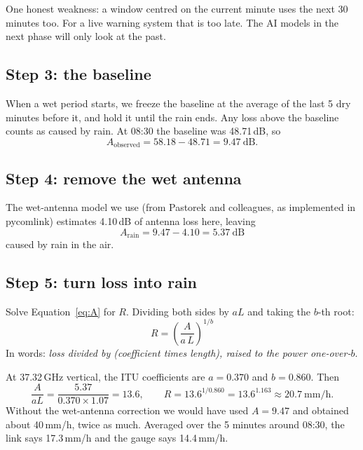 \documentclass[11pt,a4paper]{article}
\begin{document}
One honest weakness: a window centred on the current minute uses the next 30 minutes too. For a live warning
system that is too late. The AI models in the next phase will only look at the past.

\subsection*{Step 3: the baseline}
When a wet period starts, we freeze the baseline at the average of the last 5 dry minutes before it, and hold
it until the rain ends. Any loss above the baseline counts as caused by rain. At 08:30 the baseline was 48.71\,dB, so
\[
A_\text{observed} = 58.18 - 48.71 = 9.47\ \text{dB}.
\]

\subsection*{Step 4: remove the wet antenna}
The wet-antenna model we use (from Pastorek and colleagues, as implemented in pycomlink) estimates
4.10\,dB of antenna loss here, leaving
\[
A_\text{rain} = 9.47 - 4.10 = 5.37\ \text{dB}
\]
caused by rain in the air.

\subsection*{Step 5: turn loss into rain}
Solve Equation~\ref{eq:A} for $R$. Dividing both sides by $aL$ and taking the $b$-th root:
\begin{equation}
R = \left(\frac{A}{a\,L}\right)^{1/b}
\label{eq:inverse}
\end{equation}
In words: \emph{loss divided by (coefficient times length), raised to the power one-over-$b$}.

\begin{example}
At 37.32\,GHz vertical, the ITU coefficients are $a = 0.370$ and $b = 0.860$. Then
\[
\frac{A}{aL} = \frac{5.37}{0.370\times1.07} = 13.6, \qquad
R = 13.6^{1/0.860} = 13.6^{1.163} \approx 20.7\ \text{mm/h}.
\]
Without the wet-antenna correction we would have used $A = 9.47$ and obtained about 40\,mm/h, twice as much.
Averaged over the 5 minutes around 08:30, the link says 17.3\,mm/h and the gauge says 14.4\,mm/h.
\end{example}
\end{document}
